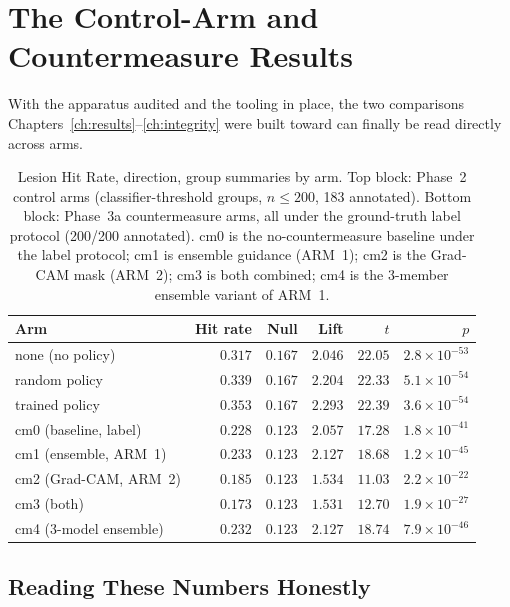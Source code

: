 \section{The Control-Arm and Countermeasure Results}
\label{sec:arm_results}

With the apparatus audited and the tooling in place, the two comparisons
Chapters~\ref{ch:results}--\ref{ch:integrity} were built toward can
finally be read directly across arms.

\begin{table}[h]
\centering
\caption[Control-arm and countermeasure LHR summary]{Lesion Hit Rate, \pton{}
direction, group summaries by arm. Top block: Phase~2 control arms
(classifier-threshold groups, $n \le 200$, 183 annotated). Bottom block:
Phase~3a countermeasure arms, all under the ground-truth label protocol
(200/200 annotated). cm0 is the no-countermeasure baseline under the label
protocol; cm1 is ensemble guidance (ARM~1); cm2 is the Grad-CAM mask
(ARM~2); cm3 is both combined; cm4 is the 3-member ensemble variant of
ARM~1.}
\label{tab:lhr_arms}
\begin{tabular}{@{}lrrrrr@{}}
\toprule
\textbf{Arm} & \textbf{Hit rate} & \textbf{Null} & \textbf{Lift} & \textbf{$t$} & \textbf{$p$} \\
\midrule
none (no policy)     & $0.317$ & $0.167$ & $2.046$ & $22.05$ & $2.8\times10^{-53}$ \\
random policy         & $0.339$ & $0.167$ & $2.204$ & $22.33$ & $5.1\times10^{-54}$ \\
trained policy         & $0.353$ & $0.167$ & $2.293$ & $22.39$ & $3.6\times10^{-54}$ \\
\midrule
cm0 (baseline, label)  & $0.228$ & $0.123$ & $2.057$ & $17.28$ & $1.8\times10^{-41}$ \\
cm1 (ensemble, ARM~1)   & $0.233$ & $0.123$ & $2.127$ & $18.68$ & $1.2\times10^{-45}$ \\
cm2 (Grad-CAM, ARM~2)   & $0.185$ & $0.123$ & $1.534$ & $11.03$ & $2.2\times10^{-22}$ \\
cm3 (both)              & $0.173$ & $0.123$ & $1.531$ & $12.70$ & $1.9\times10^{-27}$ \\
cm4 (3-model ensemble)  & $0.232$ & $0.123$ & $2.127$ & $18.74$ & $7.9\times10^{-46}$ \\
\bottomrule
\end{tabular}
\end{table}

\subsection{Reading These Numbers Honestly}

